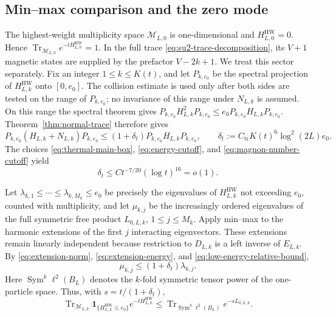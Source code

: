 \documentclass[11pt]{article}
\numberwithin{equation}{section}
\theoremstyle{remark}
\newcommand{\Tr}{\operatorname{Tr}}
\newcommand{\1}{\mathbf 1}
\newcommand{\cM}{\mathcal M}
\newcommand{\Sym}{\operatorname{Sym}}
\newcommand{\HW}{\mathrm{HW}}
\begin{document}
\subsection{Min--max comparison and the zero mode}
\label{subsec:minmax-zero-mode}

The highest-weight multiplicity space \(\cM_{L,0}\) is one-dimensional and
\(H_{L,0}^{\HW}=0\).  Hence
\(\Tr_{\cM_{L,0}}e^{-tH_{L,0}^{\HW}}=1\).  In the full trace
\eqref{eq:su2-trace-decomposition}, its \(V+1\) magnetic states are supplied
by the prefactor \(V-2k+1\).  We treat this sector separately.  Fix an integer
\(1\leq k\leq K(t)\), and let \(P_{k,e_0}\) be the spectral
projection of
\(H_{L,k}^{\HW}\) onto \([0,e_0]\).  The collision estimate is used only
after both sides are tested on the range of \(P_{k,e_0}\); no invariance
of this range under \(N_{L,k}\) is assumed.
On this range the spectral theorem gives
\(P_{k,e_0}H_{L,k}^2P_{k,e_0}
 \leq e_0P_{k,e_0}H_{L,k}P_{k,e_0}\).
Theorem~\ref{thm:normal-trace} therefore gives
\begin{equation}
 P_{k,e_0}(H_{L,k}+N_{L,k})P_{k,e_0}
 \leq(1+\delta_t)P_{k,e_0}H_{L,k}P_{k,e_0},
 \qquad
 \delta_t:=C_{\mathrm{tr}}K(t)^6\log^2(2L)e_0.
 \label{eq:low-energy-relative-bound}
\end{equation}
The choices \eqref{eq:thermal-main-box}, \eqref{eq:energy-cutoff}, and
\eqref{eq:magnon-number-cutoff} yield
\begin{equation}
 \delta_t\leq Ct^{-7/20}(\log t)^{16}=o(1).
 \label{eq:delta-small}
\end{equation}

Let
\(\lambda_{k,1}\leq\cdots\leq\lambda_{k,M_k}\leq e_0\) be precisely the
eigenvalues of \(H_{L,k}^{\HW}\) not exceeding \(e_0\), counted with
multiplicity, and let \(\mu_{k,j}\) be the increasingly ordered
eigenvalues of the full symmetric free product \(L_{0,L,k}\),
\(1\leq j\leq M_k\).  Apply min--max to the harmonic extensions of the
first \(j\) interacting eigenvectors.  These extensions remain linearly
independent because restriction to \(D_{L,k}\) is a left inverse of
\(E_{L,k}\).  By
\eqref{eq:extension-norm}, \eqref{eq:extension-energy}, and
\eqref{eq:low-energy-relative-bound},
\begin{equation}
 \mu_{k,j}\leq(1+\delta_t)\lambda_{k,j}.
 \label{eq:minmax-eigenvalue-comparison}
\end{equation}
Here \(\Sym^k\ell^2(B_L)\) denotes the \(k\)-fold symmetric tensor power
of the one-particle space.  Thus, with \(s=t/(1+\delta_t)\),
\begin{equation}
 \Tr_{\cM_{L,k}}\1_{\{H_{L,k}^{\HW}\leq e_0\}}e^{-tH_{L,k}^{\HW}}
 \leq\Tr_{\Sym^k\ell^2(B_L)}e^{-sL_{0,L,k}}.
 \label{eq:canonical-trace-comparison}
\end{equation}
\end{document}
